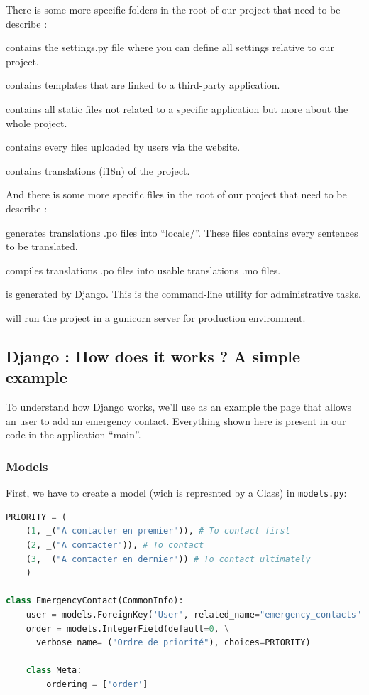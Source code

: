 \documentclass[11pt, a4paper]{article}   	%
\begin{document}
There is some more specific folders in the root of our project that need to be describe :
\begin{description}[noitemsep]
\item[- care4care/] contains the settings.py file where you can define all settings relative to our project.
\item[- templates/] contains templates that are linked to a third-party application.
\item[- static/] contains all static files not related to a specific application but more about the whole project.
\item[- media\_root/] contains every files uploaded by users via the website.
\item[- locale/] contains translations (i18n) of the project.
\end{description}

And there is some more specific files in the root of our project that need to be describe :
\begin{description}[noitemsep]

\item[- make\_locale.sh] generates translations .po files into ``locale/''. These files contains every sentences to be translated.
\item[- compile\_locale.sh] compiles translations .po files into usable translations .mo files.
\item[- manage.py] is generated by Django. This is the command-line utility for administrative tasks. 
\item[- start.sh] will run the project in a gunicorn server for production environment.
\end{description}

\subsection{Django : How does it works ? A simple example}

To understand how Django works, we'll use as an example the page that allows an user to add an emergency contact. Everything shown here is present in our code in the application ``main''.

\subsubsection{Models}
First, we have to create a model (wich is represnted by a Class) in \texttt{models.py}:

\begin{lstlisting}[language=Python, basicstyle=\footnotesize]
PRIORITY = (
    (1, _("A contacter en premier")), # To contact first
    (2, _("A contacter")), # To contact 
    (3, _("A contacter en dernier")) # To contact ultimately
    )

class EmergencyContact(CommonInfo):
    user = models.ForeignKey('User', related_name="emergency_contacts")
    order = models.IntegerField(default=0, \
      verbose_name=_("Ordre de priorité"), choices=PRIORITY)

    class Meta:
        ordering = ['order']
\end{lstlisting}
\end{document}
